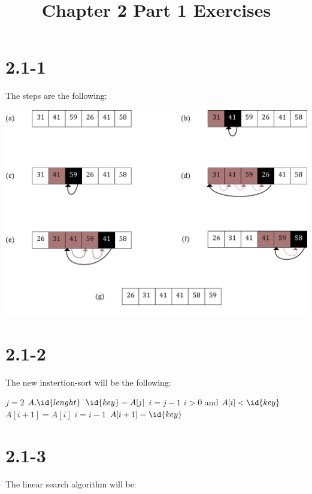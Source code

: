 \documentclass{article}
\title{Chapter 2 Part 1 Exercises}
\begin{document}
\date{}
\author{}

\maketitle

\section*{2.1-1}

The steps are the following:

\includegraphics[scale=0.3]{2_1-1.png}

\section*{2.1-2}

The new instertion-sort will be the following:

\begin{codebox}
    \li \For $j = 2$ \To $A.\id{lenght}$
    \li   \Do            
    \zi   $\id{key} = A[j]$
    \li   $i = j-1$
    \li   \While $i > 0$ and $A[i] < \id{key}$
    \li     \Do
    \zi     $A[i+1] = A[i]$
    \li     $i = i-1$
            \End
    \li   $A[i+1] = \id{key}$
          \End
\end{codebox}

\section*{2.1-3}

The linear search algorithm will be:
\end{document}

